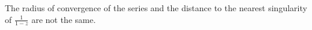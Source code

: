 \begin{Hint}
  \label{hint dydx + x y = x 2n+1}
\end{Hint}



\begin{Hint}
  \label{hint dydx + alpha y = beta e}
\end{Hint}





\begin{Hint} 
  \label{hint dwdz + 1 1-z w}
  The radius of convergence of the series and the distance to the nearest 
  singularity of $\frac{1}{1-z}$ are not the same.
\end{Hint}








